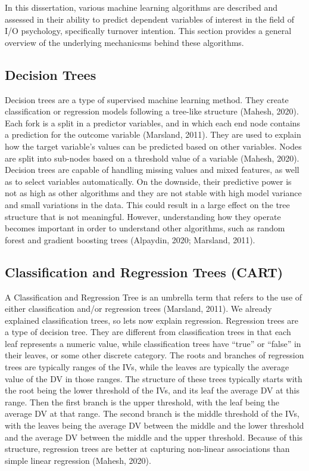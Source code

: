 \documentclass[
  man]{apa7}
\begin{document}
In this dissertation, various machine learning algorithms are described and assessed in their ability to predict dependent variables of interest in the field of I/O psychology, specifically turnover intention.
This section provides a general overview of the underlying mechanicsms behind these algorithms.

\subsection{Decision Trees}\label{decision-trees}

Decision trees are a type of supervised machine learning method.
They create classification or regression models following a tree-like structure (Mahesh, 2020).
Each fork is a split in a predictor variables, and in which each end node contains a prediction for the outcome variable (Marsland, 2011).
They are used to explain how the target variable's values can be predicted based on other variables.
Nodes are split into sub-nodes based on a threshold value of a variable (Mahesh, 2020).
Decision trees are capable of handling missing values and mixed features, as well as to select variables automatically.
On the downside, their predictive power is not as high as other algorithms and they are not stable with high model variance and small variations in the data.
This could result in a large effect on the tree structure that is not meaningful.
However, understanding how they operate becomes important in order to understand other algorithms, such as random forest and gradient boosting trees (Alpaydin, 2020; Marsland, 2011).

\subsection{Classification and Regression Trees (CART)}\label{classification-and-regression-trees-cart}

A Classification and Regression Tree is an umbrella term that refers to the use of either classification and/or regression trees (Marsland, 2011).
We already explained classification trees, so lets now explain regression.
Regression trees are a type of decision tree.
They are different from classification trees in that each leaf represents a numeric value, while classification trees have ``true'' or ``false'' in their leaves, or some other discrete category.
The roots and branches of regression trees are typically ranges of the IVs, while the leaves are typically the average value of the DV in those ranges.
The structure of these trees typically starts with the root being the lower threshold of the IVs, and its leaf the average DV at this range.
Then the first branch is the upper threshold, with the leaf being the average DV at that range.
The second branch is the middle threshold of the IVs, with the leaves being the average DV between the middle and the lower threshold and the average DV between the middle and the upper threshold.
Because of this structure, regression trees are better at capturing non-linear associations than simple linear regression (Mahesh, 2020).
\end{document}
